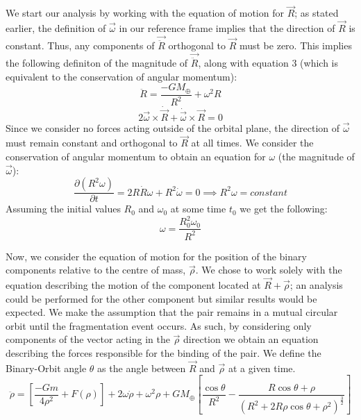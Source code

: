 \documentclass[letterpaper, preprint, paper,11pt]{AAS}	%
\begin{document}
We start our analysis by working with the equation of motion for $\vec{R}$; as stated earlier, the definition of $\vec{\omega}$ in our reference frame implies that the direction of $\vec{R}$ is constant. Thus, any components of $\vec{\ddot{R}}$ orthogonal to $\vec{R}$ must be zero. This implies the following definiton of the magnitude of $\vec{\ddot{R}}$, along with equation 3 (which is equivalent to the conservation of angular momentum): 
\begin{equation}
\ddot{R} = \frac{-GM_\oplus}{R^{2}}+\omega^{2}R
\end{equation}
\begin{equation}
2\vec{\omega}\times\dot{\vec{R}}+\dot{\vec{\omega}}\times\vec{R}=0
\end{equation}
Since we consider no forces acting outside of the orbital plane, the direction of $\vec{\omega}$ must remain constant and orthogonal to $\vec{R}$ at all times. We consider the conservation of angular momentum to obtain an equation for $\omega$ (the magnitude of $\vec{\omega}$):
\begin{equation}
\frac{\partial\left(R^{2}\omega\right)}{\partial t} = 2R\dot{R}\omega + R^{2}\dot{\omega} = 0 \implies R^{2}\omega = constant
\end{equation}
Assuming the initial values $R_0$ and $\omega_0$ at some time $t_0$ we get the following:
\begin{equation}
\omega = \frac{R_0^{2}\omega_0}{R^{2}}
\end{equation}

Now, we consider the equation of motion for the position of the binary components relative to the centre of mass, $\vec{\rho}$. We chose to work solely with the equation describing the motion of the component located at $\vec{R}+\vec{\rho}$; an analysis could be performed for the other component but similar results would be expected. We make the assumption that the pair remains in a mutual circular orbit until the fragmentation event occurs. As such, by considering only components of the vector acting in the $\vec{\rho}$ direction we obtain an equation describing the forces responsible for the binding of the pair. We define the Binary-Orbit angle $\theta$ as the angle between $\vec{R}$ and $\vec{\rho}$ at a given time.
\begin{equation}\label{eq:rdd}
\ddot{\rho} = \left[\frac{-Gm}{4\rho^{2}}+F(\rho)\right]+2\omega\dot{\rho}+\omega^{2}\rho+{GM_\oplus}\left[\frac{\cos\theta}{R^{2}}-\frac{R\cos\theta+\rho}{(R^{2}+2R\rho\cos\theta+\rho^{2})^\frac{3}{2}}\right]
\end{equation}
\end{document}
